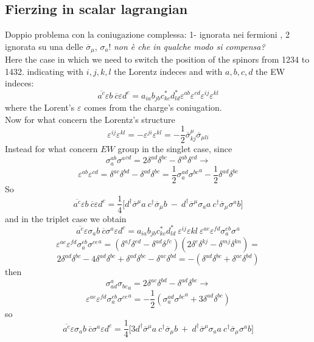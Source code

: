 \documentclass{article}
\begin{document}
\subsection{Fierzing in scalar lagrangian}
Doppio problema con la coniugazione complessa: 1- ignorata nei fermioni , 2 ignorata su una delle $\overline{\sigma}_\mu$, $\sigma_a$! \emph{non è che in qualche modo si compensa?} \\
Here the case in which we need to switch the position of the spinors from 1234 to 1432.
indicating with $i,j,k,l$ the Lorentz indeces and with $a,b,c,d$ the EW indeces: 
\[
\overline{a^c} \varepsilon b \  \overline{c} \varepsilon d^c = a_{ia} b_{jb} c^*_{kc} d^*_{ld} \varepsilon^{ab} \varepsilon^{cd} \varepsilon^{ij} \varepsilon^{kl}
\]
where the Lorent's $\varepsilon$ comes from the charge's coniugation.\\
Now for what concern the Lorentz's structure
\[
\varepsilon^{ij} \varepsilon^{kl} = - \varepsilon^{ji} \varepsilon^{kl} = -\frac{1}{2} \overline{\sigma}^\mu_{kj} \overline{\sigma}_{\mu li} 
\]
Instead for what concern $EW$ group in the singlet case, since 
\[
\sigma_a^{ab} {\sigma^a}^{cd} =2 \delta^{ad} \delta^{bc} - \delta^{ab} \delta^{cd} \rightarrow
\]
\[
\varepsilon^{ab} \varepsilon^{cd} = \delta^{ac} \delta^{bd} - \delta^{ad} \delta^{bc} = \frac{1}{2} \sigma^{ad}_a {\sigma^{bc}}^a - \frac{1}{2}\delta^{ad}\delta^{bc}
\]
So 
\[
\overline{a^c} \varepsilon b \  \overline{c} \varepsilon d^c =\frac{1}{4}\big[ d^\dagger \overline{\sigma}^ \mu a \ c^\dagger \overline{\sigma}_\mu b \ - \ d^\dagger \overline{\sigma}^\mu  \sigma_a a \ c^\dagger \overline{\sigma}_\mu  \sigma^a b \big] 
\]
and in the triplet case we obtain
\[
\overline{a^c} \varepsilon \sigma_a b \  \overline{c} \sigma^a \varepsilon  d^c = a_{ia} b_{jb} c^*_{kc} d^*_{ld} \ \varepsilon^{ij} \varepsilon{kl} \ \varepsilon^{ae} \varepsilon^{fd} \sigma^{eb}_a {\sigma^{}}^a 
\]
\[
\varepsilon^{ae} \varepsilon^{fd} \sigma^{eb}_a {\sigma^{ce}}^a =(\delta^{af}\delta^{ed} - \delta^{ad}\delta^{fe})(2\delta^{e}\delta^{kj} - \delta^{mj}\delta^{kn})=
\]
\[
2\delta^{ad}\delta^{bc} -4\delta^{ad}\delta^{bc} + \delta^{ad}\delta^{bc} -\delta^{ac}\delta^{bd}= -(\delta^{ad}\delta^{bc}+\delta^{ac}\delta^{bd})
\]
then
\[
\sigma^a_{ad}{\sigma_{bc}}_a= 2\delta^{ac}\delta^{bd}-\delta^{ad}\delta^{bc}\rightarrow
\]
\[
\varepsilon^{ae} \varepsilon^{fd} \sigma^{eb}_a {\sigma^{ce}}^a =-\frac{1}{2}(\sigma_a^{ad}{\sigma^{bc}}^a + 3 \delta^{ad}\delta^{bc})
\]
so
\[
\overline{a^c} \varepsilon \sigma_a b \  \overline{c} \sigma^a \varepsilon  d^c= \frac{1}{4}\big[3 d^\dagger \overline{\sigma}^ \mu a \ c^\dagger \overline{\sigma}_\mu b \ + \ d^\dagger \overline{\sigma}^\mu  \sigma_a a \ c^\dagger \overline{\sigma}_\mu  \sigma^a b \big] 
\]
\end{document}
